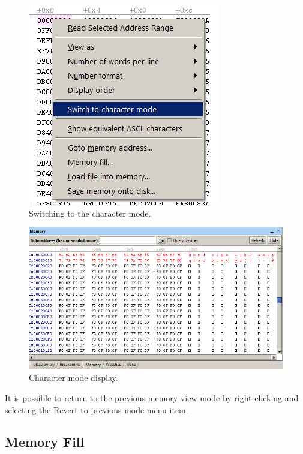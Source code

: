 \documentclass[11pt, twoside, pdftex]{article}
\begin{document}
\begin{figure}[H]
   \begin{center}
      \includegraphics[scale=0.7]{screenshots/figure40.png}
   \end{center}
   \caption{Switching to the character mode.}
   \label{fig:AMP_memorysettings_3}
\end{figure}

\begin{figure}[H]
   \begin{center}
      \includegraphics[scale=0.7]{screenshots/figure41.png}
   \end{center}
   \caption{Character mode display.}
   \label{fig:AMP_memorycharactermode}
\end{figure}

It is possible to return to the previous memory view mode by
right-clicking and selecting the {\sf Revert to previous mode}
menu item.


\subsection{Memory Fill}
\end{document}
